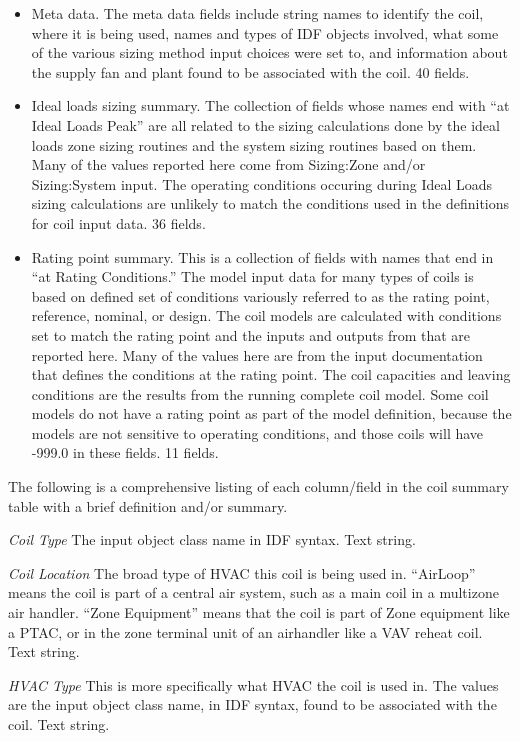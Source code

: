 \begin{itemize}
\item
  Meta data.  The meta data fields include string names to identify the coil, where it is being used, names and types of IDF objects involved, what some of the various sizing method input choices were set to, and information about the supply fan and plant found to be associated with the coil.  40 fields. 
\item
  Ideal loads sizing summary. The collection of fields whose names end with ``at Ideal Loads Peak'' are all related to the sizing calculations done by the ideal loads zone sizing routines and the system sizing routines based on them.  Many of the values reported here come from Sizing:Zone and/or Sizing:System input.  The operating conditions occuring during Ideal Loads sizing calculations are unlikely to match the conditions used in the definitions for coil input data.  36 fields.
\item
  Rating point summary.  This is a collection of fields with names that end in ``at Rating Conditions.''  The model input data for many types of coils is based on defined set of conditions variously referred to as the rating point, reference, nominal, or design.  The coil models are calculated with conditions set to match the rating point and the inputs and outputs from that are reported here.  Many of the values here are from the input documentation that defines the conditions at the rating point. The coil capacities and leaving conditions are the results from the running complete coil model. Some coil models do not have a rating point as part of the model definition, because the models are not sensitive to operating conditions, and those coils will have -999.0 in these fields. 11 fields.
\end{itemize}

The following is a comprehensive listing of each column/field in the coil summary table with a brief definition and/or summary.

\emph{Coil Type} The input object class name in IDF syntax. Text string. 

\emph{Coil Location} The broad type of HVAC this coil is being used in.  ``AirLoop'' means the coil is part of a central air system, such as a main coil in a multizone air handler.  ``Zone Equipment'' means that the coil is part of Zone equipment like a PTAC, or in the zone terminal unit of an airhandler like a VAV reheat coil.   Text string.

\emph{HVAC Type} This is more specifically what HVAC the coil is used in. The values are the input object class name, in IDF syntax, found to be associated with the coil. Text string.

